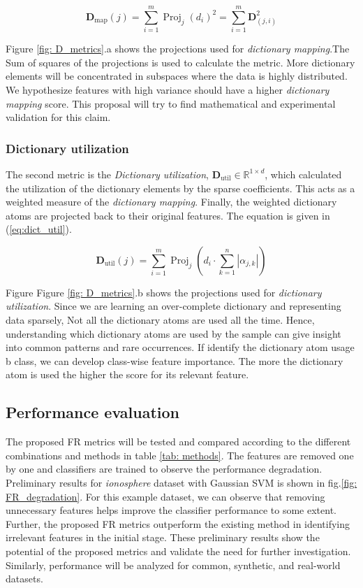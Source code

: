\documentclass[11pt]{article}
\DeclareMathOperator*{\Proj}{Proj}
\begin{document}
\begin{equation}
    \label{eq:dict_map}
    \mathbf{D}_\textrm{map}(j)= \sum_{i=1}^m \Proj_j(d_i)^2  = \sum_{i=1}^m \mathbf{D}_{(j,i)}^2 
\end{equation}

Figure \ref{fig: D_metrics}.a shows the projections used for \textit{dictionary mapping}.The Sum of squares of the projections is used to calculate the metric. More dictionary elements will be concentrated in subspaces where the data is highly distributed. We hypothesize features with high variance should have a higher \textit{dictionary mapping} score. This proposal will try to find mathematical and experimental validation for this claim.

\subsubsection{Dictionary utilization}
 The second metric is the \textit{Dictionary utilization}, $\mathbf{D}_\textrm{util} \in \mathbb{R}^{1 \times d}$, which calculated the utilization of the dictionary elements by the sparse coefficients. This acts as a weighted measure of the \textit{dictionary mapping}. Finally, the weighted dictionary atoms are projected back to their original features. The equation is given in (\ref{eq:dict_util}).

 
 \begin{equation}
    \label{eq:dict_util}
    \mathbf{D}_\textrm{util}(j)= \sum_{i=1}^m \Proj_j(d_i \cdot \sum_{k=1}^n |\alpha_{j,k}|)  
\end{equation}

Figure Figure \ref{fig: D_metrics}.b shows the projections used for \textit{dictionary utilization}. Since we are learning an over-complete dictionary and representing data sparsely, Not all the dictionary atoms are used all the time. Hence, understanding which dictionary atoms are used by the sample can give insight into common patterns and rare occurrences. If identify the dictionary atom usage b class, we can develop class-wise feature importance. The more the dictionary atom is used the higher the score for its relevant feature.

\subsection{Performance evaluation}

The proposed FR metrics will be tested and compared according to the different combinations and methods in table \ref{tab: methods}. The features are removed one by one and classifiers are trained to observe the performance degradation. 
Preliminary results for \textit{ionosphere} dataset with Gaussian SVM is shown in fig.\ref{fig: FR_degradation}.  For this example dataset, we can observe that removing unnecessary features helps improve the classifier performance to some extent. Further, the proposed FR metrics outperform the existing method in identifying irrelevant features in the initial stage. These preliminary results show the potential of the proposed metrics and validate the need for further investigation. Similarly, performance will be analyzed for common, synthetic, and real-world datasets. 
\end{document}
